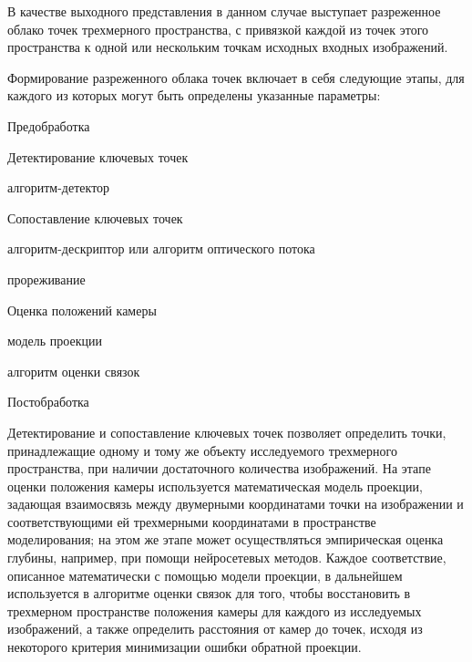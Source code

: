 В качестве выходного представления в данном случае выступает разреженное облако точек трехмерного пространства, с привязкой каждой из точек этого пространства к одной или нескольким точкам исходных входных изображений.

Формирование разреженного облака точек включает в себя следующие этапы, для каждого из которых могут быть определены указанные параметры:
\begin{textitemize}
    \item Предобработка
    \item Детектирование ключевых точек
    \begin{textitemize}
        \item алгоритм-детектор
    \end{textitemize}
    \item Сопоставление ключевых точек
    \begin{textitemize}
        \item алгоритм-дескриптор или алгоритм оптического потока
        \item прореживание
    \end{textitemize}
    \item Оценка положений камеры
    \begin{textitemize}
        \item  модель проекции
        \item алгоритм оценки связок
    \end{textitemize}
    \item Постобработка
\end{textitemize}

Детектирование и сопоставление ключевых точек позволяет определить точки, принадлежащие одному и тому же объекту исследуемого трехмерного пространства, при наличии достаточного количества изображений. На этапе оценки положения камеры используется математическая модель проекции, задающая взаимосвязь между двумерными координатами точки на изображении и соответствующими ей трехмерными координатами в пространстве моделирования; на этом же этапе может осуществляться эмпирическая оценка глубины, например, при помощи нейросетевых методов. Каждое соответствие, описанное математически с помощью модели проекции, в дальнейшем используется в алгоритме оценки связок для того, чтобы восстановить в трехмерном пространстве положения камеры для каждого из исследуемых изображений, а также определить расстояния от камер до точек, исходя из некоторого критерия минимизации ошибки обратной проекции.

